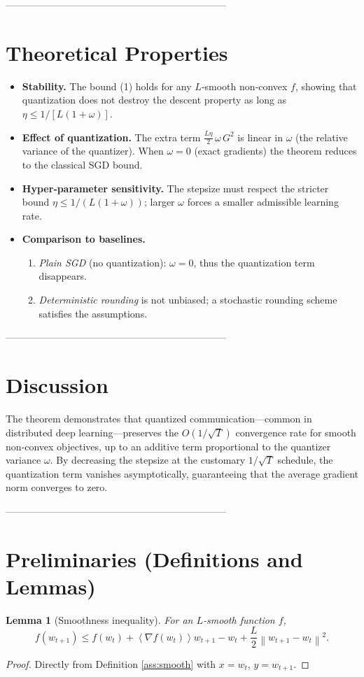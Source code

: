 \documentclass{article}
\newtheorem{lemma}{Lemma}
\newcommand{\norm}[1]{\left\|#1\right\|}
\newcommand{\inner}[1]{\left\langle #1\right\rangle}
\begin{document}
--------------------------------------------------------------------

\section*{Theoretical Properties}
\begin{itemize}
\item \textbf{Stability.} The bound (1) holds for any $L$‑smooth non‑convex $f$, showing that quantization does not destroy the descent property as long as $\eta\le1/[L(1+\omega)]$.
\item \textbf{Effect of quantization.} The extra term $\frac{L\eta}{2}\,\omega\,G^2$ is linear in $\omega$ (the relative variance of the quantizer). When $\omega=0$ (exact gradients) the theorem reduces to the classical SGD bound.
\item \textbf{Hyper‑parameter sensitivity.} The stepsize must respect the stricter bound $\eta\le 1/(L(1+\omega))$; larger $\omega$ forces a smaller admissible learning rate.
\item \textbf{Comparison to baselines.}
    \begin{enumerate}
        \item \emph{Plain SGD} (no quantization): $\omega=0$, thus the quantization term disappears.
        \item \emph{Deterministic rounding} is not unbiased; a stochastic rounding scheme satisfies the assumptions.
    \end{enumerate}
\end{itemize}

--------------------------------------------------------------------

\section*{Discussion}
The theorem demonstrates that quantized communication—common in distributed deep learning—preserves the $O(1/\sqrt{T})$ convergence rate for smooth non‑convex objectives, up to an additive term proportional to the quantizer variance $\omega$. By decreasing the stepsize at the customary $1/\sqrt{T}$ schedule, the quantization term vanishes asymptotically, guaranteeing that the average gradient norm converges to zero.

--------------------------------------------------------------------

\section*{Preliminaries (Definitions and Lemmas)}
\begin{lemma}[Smoothness inequality]\label{lem:smooth}
For an $L$‑smooth function $f$,
\[
f(w_{t+1})\le f(w_t)+\inner{\nabla f(w_t)}{w_{t+1}-w_t}
+\frac{L}{2}\norm{w_{t+1}-w_t}^2 .
\]
\end{lemma}
\begin{proof}
Directly from Definition \ref{ass:smooth} with $x=w_t$, $y=w_{t+1}$. \qedhere
\end{proof}
\end{document}
